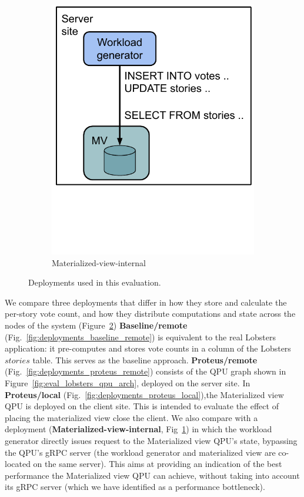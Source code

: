 \begin{figure}[H]
\begin{subfigure}[b]{0.24\textwidth}
            \includegraphics[width=\textwidth]{./figures/evaluation/evaluation_deployments_internal.pdf}
            \caption{Materialized-view-internal}
            \label{fig:deployments_mv_internal}
        \end{subfigure}
        \caption{Deployments used in this evaluation.}
        \label{fig:eval_deployments}
    \end{figure}

We compare three deployments that differ in how they store and calculate the per-story vote count,
and how they distribute computations and state across the nodes of the system (Figure~\ref{fig:eval_deployments})
\textbf{Baseline/remote} (Fig.~\ref{fig:deployments_baseline_remote}) is equivalent to the real Lobsters application:
it pre-computes and stores vote counts in a column of the Lobsters $stories$ table.
This serves as the baseline approach.
\textbf{Proteus/remote} (Fig.~\ref{fig:deployments_proteus_remote}) consists of the QPU graph shown in Figure~\ref{fig:eval_lobsters_qpu_arch},
deployed on the server site.
In \textbf{Proteus/local} (Fig.~\ref{fig:deployments_proteus_local}),the Materialized view QPU is deployed on the client site.
This is intended to evaluate the effect of placing the materialized view close the client.
We also compare with a deployment (\textbf{Materialized-view-internal}, Fig~\ref{fig:deployments_mv_internal}) in which the workload generator
directly issues request to the Materialized view QPU's state, bypassing the QPU's gRPC server
(the workload generator and materialized view are co-located on the same server).
This aims at providing an indication of the best performance the Materialized view QPU can achieve,
without taking into account its gRPC server (which we have identified as a performance bottleneck).

